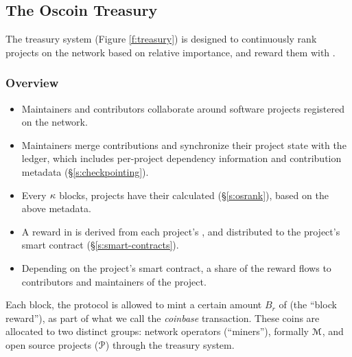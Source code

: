 \begin{figure*}[!ht]
    \par\medskip\noindent\minipage{\linewidth}
    \centering
    
    \caption{The \Oscoin{} Treasury System\label{f:treasury}}
    \endminipage\par\medskip
\end{figure*}

\subsection{The Oscoin Treasury}
\label{s:treasury}

The treasury system (Figure \ref{f:treasury}) is designed to continuously
rank projects on the network based on relative importance, and reward them with
\oscoin{}.

\subsubsection{Overview}

\begin{itemize}
    \item Maintainers and contributors collaborate around software projects
        registered on the network.
    \item Maintainers merge contributions and synchronize their project state
        with the ledger, which includes per-project dependency information and
        contribution metadata (\S\ref{s:checkpointing}).
    \item Every $\kappa$ blocks, projects have their \osrank{} calculated
        (\S\ref{s:osrank}), based on the above metadata.
    \item A reward in \oscoin{} is derived from each project's \osrank{},
        and distributed to the project's smart contract (\S\ref{s:smart-contracts}).
    \item Depending on the project's smart contract, a share of the reward flows
        to contributors and maintainers of the project.
\end{itemize}

\medskip

\noindent Each block, the protocol is allowed to mint a certain amount $B_r$ of \oscoin{}
(the ``block reward''), as part of what we call the \emph{coinbase}
transaction. These coins are allocated to two distinct groups: network
operators (``miners''), formally $\mathcal{M}$, and open source projects ($\mathcal{P}$)
through the treasury system.

